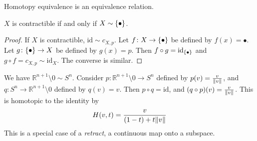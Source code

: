 \begin{lemma}
	Homotopy equivalence is an equivalence relation.
\end{lemma}
\begin{proposition}
	\( X \) is contractible if and only if \( X \sim \qty{\bullet} \).
\end{proposition}
\begin{proof}
	If \( X \) is contractible, \( \mathrm{id} \sim c_{X,p} \).
	Let \( f \colon X \to \qty{\bullet} \) be defined by \( f(x) = \bullet \).
	Let \( g \colon \qty{\bullet} \to X \) be defined by \( g(x) = p \).
	Then \( f \circ g = \mathrm{id}_{\qty{\bullet}} \) and \( g \circ f = c_{X,p} \sim \mathrm{id}_X \).
	The converse is similar.
\end{proof}
\begin{example}
	We have \( \mathbb R^{n + 1} \setminus \qty{0} \sim S^n \).
	Consider \( p \colon \mathbb R^{n + 1} \setminus \qty{0} \to S^n \) defined by \( p(v) = \frac{v}{\norm{v}} \), and \( q \colon S^n \to \mathbb R^{n + 1} \setminus \qty{0} \) defined by \( q(v) = v \).
	Then \( p \circ q = \mathrm{id} \), and \( (q \circ p)(v) = \frac{v}{\norm{v}} \).
	This is homotopic to the identity by
	\[ H(v,t) = \frac{v}{(1-t) + t\norm{v}} \]
	This is a special case of a \emph{retract}, a continuous map onto a subspace.
\end{example}
